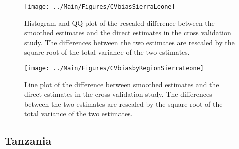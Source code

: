 \documentclass[12pt]{article}\usepackage[]{graphicx}\usepackage[]{color}
\newenvironment{knitrout}{}{} %
\begin{document}
\begin{knitrout}
\color{fgcolor}\begin{figure}[bht]

{\centering \texttt{[image: ../Main/Figures/CVbiasSierraLeone]} 

}

\caption[Histogram and QQ-plot of the rescaled difference between the smoothed estimates and the direct estimates in the cross validation study]{Histogram and QQ-plot of the rescaled difference between the smoothed estimates and the direct estimates in the cross validation study. The differences between the two estimates are rescaled by the square root of the total variance of the two estimates.}\label{fig:unnamed-chunk-299}
\end{figure}


\end{knitrout}

\begin{knitrout}
\color{fgcolor}\begin{figure}[bht]

{\centering \texttt{[image: ../Main/Figures/CVbiasbyRegionSierraLeone]} 

}

\caption[Line plot of the difference between smoothed estimates and the direct estimates in the cross validation study]{Line plot of the difference between smoothed estimates and the direct estimates in the cross validation study. The differences between the two estimates are rescaled by the square root of the total variance of the two estimates.}\label{fig:unnamed-chunk-300}
\end{figure}


\end{knitrout}


\clearpage
\subsection{Tanzania}


\end{document}
